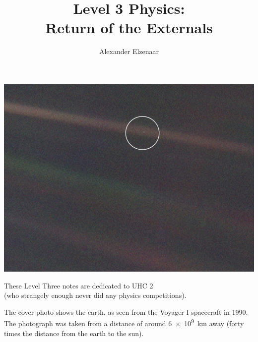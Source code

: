 \documentclass[a4paper]{amsbook}
\title[Level 3 Physics]{Level 3 Physics:\\Return of the Externals}
\author{Alexander Elzenaar}
\theoremstyle{definition}
\numberwithin{exercise}{chapter}
\numberwithin{exercise}{chapter}
\begin{document}
\begin{titlepage}
  \centering

  \makeatletter
  \vspace*{2cm}

  \includegraphics[width=\textwidth]{cover}

  \vspace*{\fill}

  \Huge{\textbf{\@title}}

  \vspace*{1cm}

  \Large\textit{\authors}

  \vspace*{\fill}

  \makeatother
\end{titlepage}


\cleardoublepage
\thispagestyle{empty}\mbox{}
\clearpage
\thispagestyle{empty}
\vspace*{13.5pc}
\begin{center}
  These Level Three notes are dedicated to UHC 2\\[2pt] (who strangely enough never did any physics competitions).
\end{center}
\vspace*{\fill}
\begin{center}
  The cover photo shows the earth, as seen from the Voyager I spacecraft in 1990. The photograph was taken from a
  distance of around \SI{6e9}{\kilo\metre} away (forty times the distance from the earth to the sun).
\end{center}
\vspace*{6.75pc}
\cleardoublepage
\end{document}
